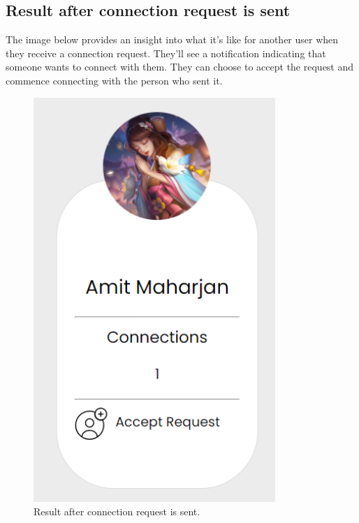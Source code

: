 \subsection{Result after connection request is sent}
The image below provides an insight into what it's like for another user when they receive a connection request. They'll see a notification indicating that someone wants to connect with them. They can choose to accept the request and commence connecting with the person who sent it. 
\begin{figure}[H]
    \centering
    \includegraphics[height=0.25\textheight]{Outcome-ss/accept-request.png}
    \caption{Result after connection request is sent.}
    \label{fig:Result after connection request is sent}
\end{figure}
